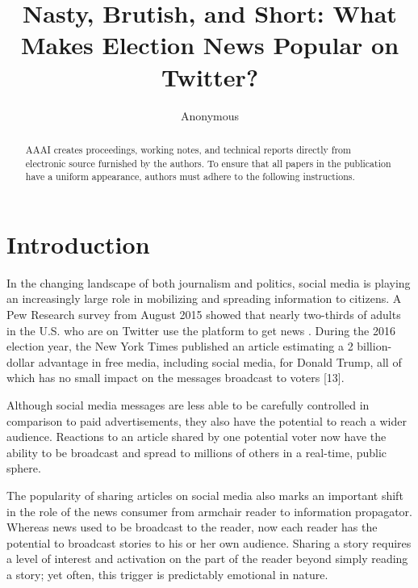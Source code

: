 \documentclass[letterpaper]{article}
\begin{document}
%
\title{Nasty, Brutish, and Short: 
What Makes Election News Popular on Twitter?}
\author{Anonymous\\
}
\maketitle
\begin{abstract}
AAAI creates proceedings, working notes, and technical reports directly from electronic source furnished by the authors. To ensure that all papers in the publication have a uniform appearance, authors must adhere to the following instructions. 
\end{abstract}

 
\section{Introduction}
In the changing landscape of both journalism and politics, social media is playing an increasingly large role in mobilizing and spreading information to citizens. A Pew Research survey from August 2015 showed that nearly two-thirds of adults in the U.S. who are on Twitter use the platform to get news \cite{pew-Twitter-news}. During the 2016 election year, the New York Times published an article estimating a 2 billion-dollar advantage in free media, including social media, for Donald Trump, all of which has no small impact on the messages broadcast to voters [13].

Although social media messages are less able to be carefully controlled in comparison to paid advertisements, they also have the potential to reach a wider audience. Reactions to an article shared by one potential voter now have the ability to be broadcast and spread to millions of others in a real-time, public sphere. 


The popularity of sharing articles on social media also marks an important shift in the role of the news consumer from armchair reader to information propagator. Whereas news used to be broadcast to the reader, now each reader has the potential to broadcast stories to his or her own audience. Sharing a story requires a level of interest and activation on the part of the reader beyond simply reading a story; yet often, this trigger is predictably emotional in nature. 
\end{document}
